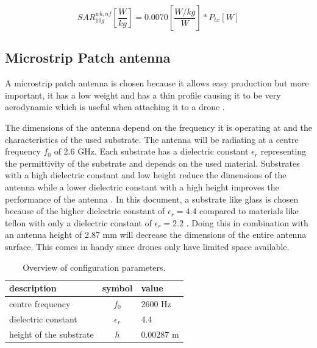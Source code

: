 \documentclass[twocolumn]{phdsymp} %
\begin{document}
\begin{equation} 
SAR^{wb,nf}_{10g} \left[\frac{W}{kg}\right] = 0.0070 \left[\frac{W/kg}{W}\right] * P_{tx} [W]
\label{eq:ulToSar}
\end{equation}

\subsection{Microstrip Patch antenna}
A microstrip patch antenna is chosen because it allows easy production but more important, it has a low weight 
and has a thin profile causing it to be very aerodynamic which is useful when attaching it to a drone \cite{J13_microstripadvantages}.

The dimensions of the antenna depend on the frequency it is operating at and the characteristics of the used substrate.
The antenna will be radiating at a centre frequency $f_0$ of 2.6 GHz. Each substrate has a dielectric constant $\epsilon_r$ representing 
the permittivity of the substrate and depends on the used material.
Substrates with a high dielectric constant and low height 
reduce the dimensions of the antenna
while a lower dielectric constant with a high height improves the performance of the antenna \cite{J14_antennadesign,J15_antennadesign}. 
In this document, a substrate like glass 
is chosen because of the higher dielectric constant of $\epsilon_r = 4.4$ compared to materials like teflon with only a dielectric 
constant of $\epsilon_r = 2.2$ \cite{J14_antennadesign}. 
Doing this in combination with an antenna height of 2.87 mm will decrease the dimensions of the entire antenna surface.
This comes in handy since drones only have limited space available.

\begin{table}[h!]
\centering
\begin{tabular}{|l|c|l|}
\hline
 description            & symbol          & value         \\    \hline
 centre frequency       & $f_0$           & 2600 Hz       \\ 
 dielectric constant    & $\epsilon_r$    & 4.4         \\ 
 height of the substrate & $h$             & 0.00287 m    \\ \hline
\end{tabular}
\caption{Overview of configuration parameters.}
\label{table:antennaparas}
\end{table}
\end{document}
